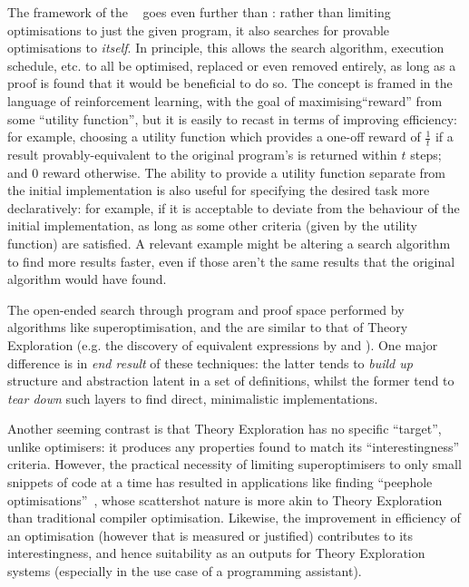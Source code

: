 The framework of the \goedelmachine{}~\cite{Schmidhuber:05icann} goes even
further than \hsearch{}: rather than limiting optimisations to just the given
program, it also searches for provable optimisations to \emph{itself}. In
principle, this allows the search algorithm, execution schedule, etc. to all be
optimised, replaced or even removed entirely, as long as a proof is found that
it would be beneficial to do so. The \goedelmachine{} concept is framed in the
language of reinforcement learning, with the goal of maximising``reward'' from
some ``utility function'', but it is easily to recast in terms of improving
efficiency: for example, choosing a utility function which provides a one-off
reward of $\frac{1}{t}$ if a result provably-equivalent to the original
program's is returned within $t$ steps; and 0 reward otherwise. The ability to
provide a utility function separate from the initial implementation is also
useful for specifying the desired task more declaratively: for example, if it is
acceptable to deviate from the behaviour of the initial implementation, as long
as some other criteria (given by the utility function) are satisfied. A relevant
example might be altering a search algorithm to find more results faster, even
if those aren't the same results that the original algorithm would have found.

The open-ended search through program and proof space performed by algorithms
like superoptimisation, \hsearch{} and the \goedelmachine{} are similar to that
of Theory Exploration (e.g. the discovery of equivalent expressions by
\isacosy{} and \quickspec{}). One major difference is in \emph{end result} of
these techniques: the latter tends to \emph{build up} structure and abstraction
latent in a set of definitions, whilst the former tend to \emph{tear down} such
layers to find direct, minimalistic implementations.

Another seeming contrast is that Theory Exploration has no specific ``target'',
unlike optimisers: it produces any properties found to match its
``interestingness'' criteria. However, the practical necessity of limiting
superoptimisers to only small snippets of code at a time has resulted in
applications like finding ``peephole optimisations''~\cite{Bansal.Aiken:2006},
whose scattershot nature is more akin to Theory Exploration than traditional
compiler optimisation. Likewise, the improvement in efficiency of an
optimisation (however that is measured or justified) contributes to its
interestingness, and hence suitability as an outputs for Theory Exploration
systems (especially in the use case of a programming assistant).

